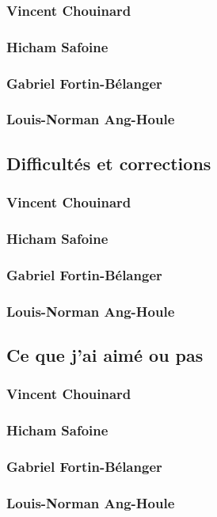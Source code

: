 \documentclass[10pt,a4paper,final]{article}
\begin{document}
\begin{spacing}{1.5}
\subsubsection{Vincent Chouinard}

\subsubsection{Hicham Safoine}

\subsubsection{Gabriel Fortin-Bélanger}

\subsubsection{Louis-Norman Ang-Houle}



\subsection{Difficultés et corrections}
\subsubsection{Vincent Chouinard}

\subsubsection{Hicham Safoine}

\subsubsection{Gabriel Fortin-Bélanger}

\subsubsection{Louis-Norman Ang-Houle}


\subsection{Ce que j'ai aimé ou pas}
\subsubsection{Vincent Chouinard}

\subsubsection{Hicham Safoine}

\subsubsection{Gabriel Fortin-Bélanger}

\subsubsection{Louis-Norman Ang-Houle}
\end{spacing}
\end{document}

